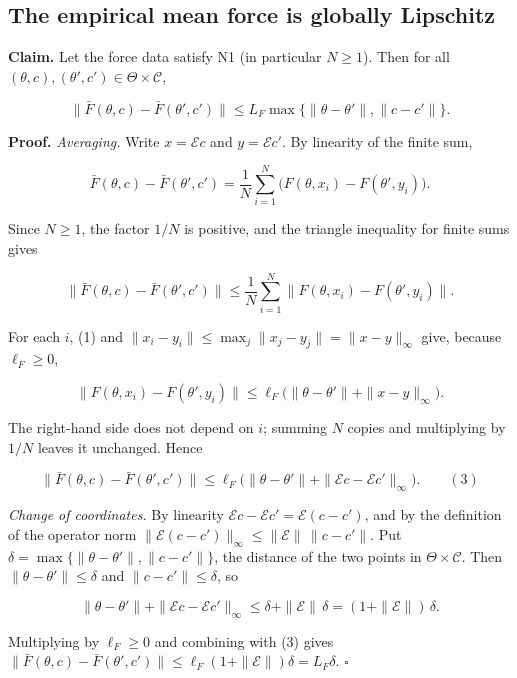 \documentclass[11pt,a4paper]{report}
\begin{document}
\subsection{\texorpdfstring{The empirical mean force is globally Lipschitz}{The empirical mean force is globally Lipschitz}}


\textbf{Claim.} Let the force data satisfy N1 (in particular \(N\ge1\)). Then for all \((\theta,c),(\theta',c')\in\Theta\times\mathcal C\),


\[\bigl\|\bar F(\theta,c)-\bar F(\theta',c')\bigr\|\le L_F\max\{\|\theta-\theta'\|,\|c-c'\|\}.\]


\textbf{Proof.} \emph{Averaging.} Write \(x=\mathcal Ec\) and \(y=\mathcal Ec'\). By linearity of the finite sum,


\[\bar F(\theta,c)-\bar F(\theta',c')=\frac1N\sum_{i=1}^N\bigl(F(\theta,x_i)-F(\theta',y_i)\bigr).\]


Since \(N\ge1\), the factor \(1/N\) is positive, and the triangle inequality for finite sums gives


\[\bigl\|\bar F(\theta,c)-\bar F(\theta',c')\bigr\|\le\frac1N\sum_{i=1}^N\bigl\|F(\theta,x_i)-F(\theta',y_i)\bigr\|.\]


For each \(i\), (1) and \(\|x_i-y_i\|\le\max_j\|x_j-y_j\|=\|x-y\|_\infty\) give, because \(\ell_F\ge0\),


\[\bigl\|F(\theta,x_i)-F(\theta',y_i)\bigr\|\le\ell_F\bigl(\|\theta-\theta'\|+\|x-y\|_\infty\bigr).\]


The right-hand side does not depend on \(i\); summing \(N\) copies and multiplying by \(1/N\) leaves it unchanged. Hence


\[\bigl\|\bar F(\theta,c)-\bar F(\theta',c')\bigr\|\le\ell_F\bigl(\|\theta-\theta'\|+\|\mathcal Ec-\mathcal Ec'\|_\infty\bigr).\qquad(3)\]


\emph{Change of coordinates.} By linearity \(\mathcal Ec-\mathcal Ec'=\mathcal E(c-c')\), and by the definition of the operator norm \(\|\mathcal E(c-c')\|_\infty\le\|\mathcal E\|\,\|c-c'\|\). Put \(\delta=\max\{\|\theta-\theta'\|,\|c-c'\|\}\), the distance of the two points in \(\Theta\times\mathcal C\). Then \(\|\theta-\theta'\|\le\delta\) and \(\|c-c'\|\le\delta\), so


\[\|\theta-\theta'\|+\|\mathcal Ec-\mathcal Ec'\|_\infty\le\delta+\|\mathcal E\|\,\delta=(1+\|\mathcal E\|)\,\delta .\]


Multiplying by \(\ell_F\ge0\) and combining with (3) gives \(\|\bar F(\theta,c)-\bar F(\theta',c')\|\le\ell_F(1+\|\mathcal E\|)\delta=L_F\delta\). \(\square\)
\end{document}
